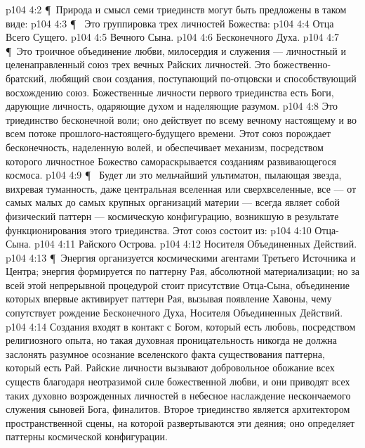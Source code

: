 \vs p104 4:2 \P\ Природа и смысл семи триединств могут быть предложены в таком виде:
\vs p104 4:3 \P\  Это группировка трех личностей Божества:
\vs p104 4:4 \bibnobreakspace Отца Всего Сущего.
\vs p104 4:5 \bibnobreakspace Вечного Сына.
\vs p104 4:6 \bibnobreakspace Бесконечного Духа.
\vs p104 4:7 \P\ Это троичное объединение любви, милосердия и служения --- личностный и целенаправленный союз трех вечных Райских личностей. Это божественно\hyp{}братский, любящий свои создания, поступающий по\hyp{}отцовски и способствующий восхождению союз. Божественные личности первого триединства есть Боги, дарующие личность, одаряющие духом и наделяющие разумом.
\vs p104 4:8 Это триединство бесконечной воли; оно действует по всему вечному настоящему и во всем потоке прошлого\hyp{}настоящего\hyp{}будущего времени. Этот союз порождает бесконечность, наделенную волей, и обеспечивает механизм, посредством которого личностное Божество самораскрывается созданиям развивающегося космоса.
\vs p104 4:9 \P\  Будет ли это мельчайший ультиматон, пылающая звезда, вихревая туманность, даже центральная вселенная или сверхвселенные, все --- от самых малых до самых крупных организаций материи --- всегда являет собой физический паттерн --- космическую конфигурацию, возникшую в результате функционирования этого триединства. Этот союз состоит из:
\vs p104 4:10 \bibnobreakspace Отца\hyp{}Сына.
\vs p104 4:11 \bibnobreakspace Райского Острова.
\vs p104 4:12 \bibnobreakspace Носителя Объединенных Действий.
\vs p104 4:13 \P\ Энергия организуется космическими агентами Третьего Источника и Центра; энергия формируется по паттерну Рая, абсолютной материализации; но за всей этой непрерывной процедурой стоит присутствие Отца\hyp{}Сына, объединение которых впервые активирует паттерн Рая, вызывая появление Хавоны, чему сопутствует рождение Бесконечного Духа, Носителя Объединенных Действий.
\vs p104 4:14 Создания входят в контакт с Богом, который есть любовь, посредством религиозного опыта, но такая духовная проницательность никогда не должна заслонять разумное осознание вселенского факта существования паттерна, который есть Рай. Райские личности вызывают добровольное обожание всех существ благодаря неотразимой силе божественной любви, и они приводят всех таких духовно возрожденных личностей в небесное наслаждение нескончаемого служения сыновей Бога, финалитов. Второе триединство является архитектором пространственной сцены, на которой развертываются эти деяния; оно определяет паттерны космической конфигурации.
